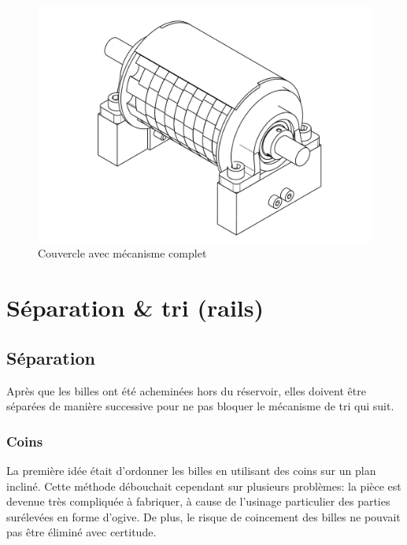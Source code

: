 \begin{figure}
    \centering
    \includegraphics[width=\textwidth]{Graphics/Roue/DRAWING_COUVERCLE_COMPLET.pdf}
    \caption{Couvercle avec mécanisme complet}
\end{figure}

\section{Séparation \& tri (rails)}

\subsection{Séparation}
Après que les billes ont été acheminées hors du réservoir, elles doivent être séparées de manière successive pour ne pas bloquer le mécanisme de tri qui suit.

\subsubsection{Coins}
La première idée était d'ordonner les billes en utilisant des coins sur un plan incliné. Cette méthode débouchait cependant sur plusieurs problèmes: la pièce est devenue très compliquée à fabriquer, à cause de l'usinage particulier des parties surélevées en forme d'ogive. De plus, le risque de coincement des billes ne pouvait pas être éliminé avec certitude.

